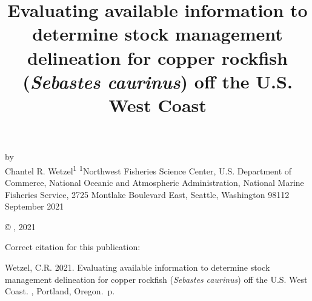 \documentclass[11pt,
  english,
  a4paper,
]{article}
\date{}
\newcommand{\trTitle}{Evaluating available information to determine stock management delineation for copper rockfish (\emph{Sebastes caurinus}) off the U.S. West Coast}
\newcommand{\trYear}{2021}
\newcommand{\trMonth}{September}
\newcommand{\trAuthsBack}{Wetzel, C.R}
\newcommand{\trCitation}{
\begin{hangparas}{1em}{1}
\trAuthsBack{}. \trYear{}. \trTitle{}. \glsentrylong{pfmc}, Portland, Oregon. \pageref{LastPage}{}\,p.
\end{hangparas}}
\begin{document}

\renewcommand*{\thefootnote}{\fnsymbol{footnote}}

\small
\thispagestyle{empty}
\noindent
\begin{center}
\title{Evaluating available information to determine stock management delineation for copper rockfish (\emph{Sebastes caurinus}) off the U.S. West Coast}
\vspace{1.5cm}
{\Large\textbf{}}
\vfill
by\\
Chantel R. Wetzel\textsuperscript{1}\vfill
\textsuperscript{1}Northwest Fisheries Science Center, U.S. Department of Commerce, National Oceanic and Atmospheric Administration, National Marine Fisheries Service, 2725 Montlake Boulevard East, Seattle, Washington 98112\vfill
\trMonth{} \trYear{}
\end{center}
\clearpage

\thispagestyle{empty}
\vspace*{\fill}
\begin{center}
\copyright{} , \trYear{}\\
\end{center}
\par
\bigskip
\noindent
Correct citation for this publication:
\bigskip
\par
\trCitation{}
\clearpage


\tableofcontents\clearpage
\label{TRlastRoman}
\clearpage

\newpage
\thispagestyle{empty} %

\pagestyle{plain}  %
\renewcommand*{\thefootnote}{\arabic{footnote}}  %
\setcounter{footnote}{0}  %
\renewcommand{\headrulewidth}{0.5pt}
\renewcommand{\footrulewidth}{0.5pt}

\newcommand{\lt}{\ensuremath <}
\newcommand{\gt}{\ensuremath >}
\end{document}
